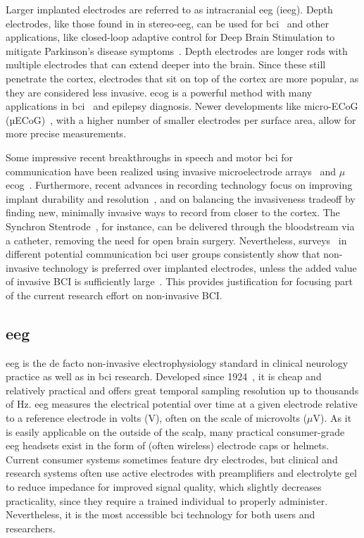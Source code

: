 Larger implanted electrodes are referred to as intracranial \ac{eeg} (i\ac{eeg}).
Depth electrodes, like those found in in stereo-\ac{eeg}, can be used for \ac{bci}~\cite{Wu2024}
 and other applications, like closed-loop adaptive control for Deep Brain Stimulation to mitigate Parkinson's disease
symptoms~\cite{Arlotti2018}.
Depth electrodes are longer rods with multiple electrodes that can extend deeper into
the brain.
Since these still penetrate the cortex, electrodes that sit on top of the cortex are
more popular, as they are considered less invasive.
\Ac{ecog} is a powerful method with many applications in \ac{bci}~\cite{Schalk2011} and
epilepsy diagnosis.
Newer developments like micro-ECoG (µECoG)~\cite{Shokoueinejad2019}, with a higher
number of smaller electrodes per surface area, allow for more precise measurements.

Some impressive recent breakthroughs in speech and motor \ac{bci} for communication have
been realized using invasive microelectrode arrays~\cite{Willett2021} and
$\mu$\Ac{ecog}~\cite{Metzger2023}.
Furthermore, recent advances in recording technology focus on improving implant
durability and resolution~\cite{Steinmetz2021}, and on balancing the invasiveness
tradeoff by finding new, minimally invasive ways to record from closer to the cortex.
The Synchron Stentrode~\cite{Mitchell2023}, for instance, can be delivered through the
bloodstream via a catheter, removing the need for open brain surgery.
Nevertheless, surveys~\cite{Huggins2011, Huggins2015, Branco2021} in different
potential communication \ac{bci} user groups consistently show that non-invasive
technology is preferred over implanted electrodes, unless the added value of invasive
BCI is sufficiently large~\cite{Kageyama2020}.
This provides justification for focusing part of the current research effort on
non-invasive BCI.

\subsection{\Acl{eeg}}

\Ac{eeg} is the de facto non-invasive electrophysiology standard in clinical neurology
practice as well as in \ac{bci} research.
Developed since 1924~\cite{Berger1929}, it is cheap and relatively practical and offers
great temporal sampling resolution up to thousands of Hz.
\Ac{eeg} measures the electrical potential over time at a given electrode relative to a
reference electrode in volts (V), often on the scale of microvolts ($\mu$V).
As it is easily applicable on the outside of the scalp, many practical consumer-grade
\ac{eeg} headsets exist in the form of (often wireless) electrode caps or helmets.
Current consumer systems sometimes feature dry electrodes, but clinical and research
systems often use active electrodes with preamplifiers and electrolyte gel to reduce
impedance for improved signal quality, which slightly decreases practicality, since they
require a trained individual to properly administer.
Nevertheless, it is the most accessible \ac{bci} technology for both users and
researchers.

